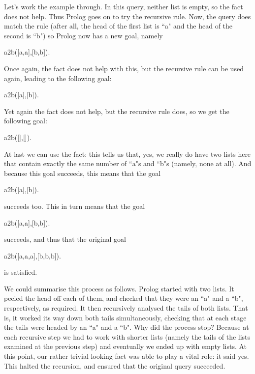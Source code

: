 Let's work the example through. In this query, neither list is empty,
so the fact does not help. Thus Prolog goes on to try the recursive
rule. Now, the query does match the rule (after all, the head of the
first list is ``a" and the head of the second is ``b") so
Prolog now has a new goal, namely
\begin{LPNcodedisplay}
a2b([a,a],[b,b]).
\end{LPNcodedisplay}
Once again, the fact does not help with this, but the recursive rule
can be used again, leading to the following goal:
\begin{LPNcodedisplay}
a2b([a],[b]).
\end{LPNcodedisplay}
Yet again the fact does not help, but the recursive rule does, so we
get the following goal:
\begin{LPNcodedisplay}
a2b([],[]).
\end{LPNcodedisplay}
At last we can use the fact: this tells us that, yes, we really do
have two lists here that contain exactly the same number of ``a"s
and ``b"s (namely, none at all). And because this goal succeeds,
this means that the goal
\begin{LPNcodedisplay}
a2b([a],[b]).
\end{LPNcodedisplay}
succeeds too. This in turn means that the goal
\begin{LPNcodedisplay}
a2b([a,a],[b,b]).
\end{LPNcodedisplay}
succeeds, and thus that the original goal
\begin{LPNcodedisplay}
a2b([a,a,a],[b,b,b]).
\end{LPNcodedisplay}
is satisfied.

We could summarise this process as follows.  Prolog started with two
lists. It peeled the head off each of them, and checked that they were
an ``a" and a ``b", respectively, as required. It then recursively
analysed the tails of both lists. That is, it worked its way down both
tails simultaneously, checking that at each stage the tails were
headed by an ``a" and a ``b".  Why did the process stop?  Because at
each recursive step we had to work with shorter lists (namely the
tails of the lists examined at the previous step) and eventually we
ended up with empty lists.  At this point, our rather trivial looking
fact was able to play a vital role: it said yes. This halted the
recursion, and ensured that the original query succeeded.

